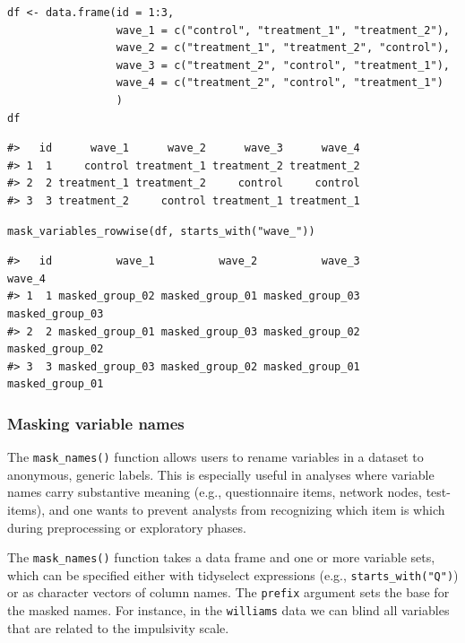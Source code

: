 \begin{verbatim}
df <- data.frame(id = 1:3,
                 wave_1 = c("control", "treatment_1", "treatment_2"),
                 wave_2 = c("treatment_1", "treatment_2", "control"),
                 wave_3 = c("treatment_2", "control", "treatment_1"),
                 wave_4 = c("treatment_2", "control", "treatment_1")
                 )
df
\end{verbatim}

\begin{verbatim}
#>   id      wave_1      wave_2      wave_3      wave_4
#> 1  1     control treatment_1 treatment_2 treatment_2
#> 2  2 treatment_1 treatment_2     control     control
#> 3  3 treatment_2     control treatment_1 treatment_1
\end{verbatim}

\begin{verbatim}
mask_variables_rowwise(df, starts_with("wave_"))
\end{verbatim}

\begin{verbatim}
#>   id          wave_1          wave_2          wave_3          wave_4
#> 1  1 masked_group_02 masked_group_01 masked_group_03 masked_group_03
#> 2  2 masked_group_01 masked_group_03 masked_group_02 masked_group_02
#> 3  3 masked_group_03 masked_group_02 masked_group_01 masked_group_01
\end{verbatim}

\subsubsection{Masking variable names}\label{masking-variable-names}

The \texttt{mask\_names()} function allows users to rename variables in a dataset to anonymous, generic labels. This is especially useful in analyses where variable names carry substantive meaning (e.g., questionnaire items, network nodes, test-items), and one wants to prevent analysts from recognizing which item is which during preprocessing or exploratory phases.

The \texttt{mask\_names()} function takes a data frame and one or more variable sets, which can be specified either with tidyselect expressions (e.g., \texttt{starts\_with("Q")}) or as character vectors of column names. The \texttt{prefix} argument sets the base for the masked names. For instance, in the \texttt{williams} data we can blind all variables that are related to the impulsivity scale.

